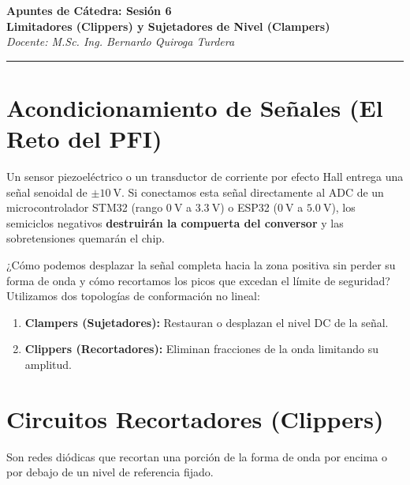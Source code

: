 \documentclass[11pt, a4paper]{article}
\begin{document}
\begin{center}
    {\LARGE \textbf{Apuntes de Cátedra: Sesión 6}}\\[0.3cm]
    {\large \textbf{Limitadores (Clippers) y Sujetadores de Nivel (Clampers)}}\\
    \textit{Docente: M.Sc. Ing. Bernardo Quiroga Turdera}
    \vspace{0.3cm}
    \hrule
\end{center}

\vspace{0.3cm}

\section{Acondicionamiento de Señales (El Reto del PFI)}
Un sensor piezoeléctrico o un transductor de corriente por efecto Hall entrega una señal senoidal de $\pm \qty{10}{\volt}$. Si conectamos esta señal directamente al ADC de un microcontrolador STM32 (rango $\qty{0}{\volt}$ a $\qty{+3.3}{\volt}$) o ESP32 ($\qty{0}{\volt}$ a $\qty{+5.0}{\volt}$), los semiciclos negativos \textbf{destruirán la compuerta del conversor} y las sobretensiones quemarán el chip. 

¿Cómo podemos desplazar la señal completa hacia la zona positiva sin perder su forma de onda y cómo recortamos los picos que excedan el límite de seguridad? Utilizamos dos topologías de conformación no lineal:
\begin{enumerate}
    \item \textbf{Clampers (Sujetadores):} Restauran o desplazan el nivel DC de la señal.
    \item \textbf{Clippers (Recortadores):} Eliminan fracciones de la onda limitando su amplitud.
\end{enumerate}

\section{Circuitos Recortadores (Clippers)}
Son redes diódicas que recortan una porción de la forma de onda por encima o por debajo de un nivel de referencia fijado.
\end{document}
